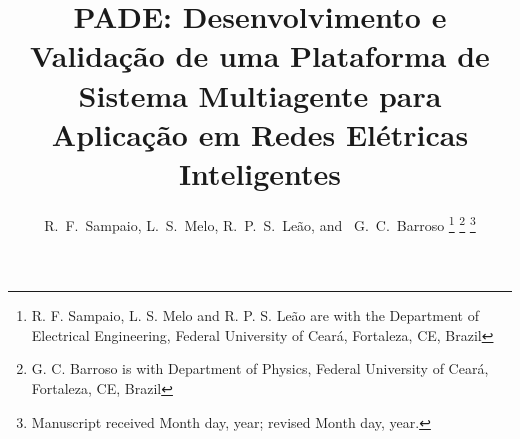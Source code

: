 \documentclass[journal]{IEEEtran}
\begin{document}
%
\title{PADE: Desenvolvimento e Validação de uma Plataforma de Sistema Multiagente para Aplicação em Redes Elétricas Inteligentes}
%
%
%

\author{R.~F.~Sampaio,
        L.~S.~Melo,
        R.~P.~S.~Leão,
        and ~G.~C.~Barroso%
\thanks{R. F. Sampaio, L. S. Melo and R. P. S. Leão are with the Department
of Electrical Engineering, Federal University of Ceará, Fortaleza,
CE, Brazil}%
\thanks{G. C. Barroso is with Department of Physics, Federal University of Ceará, Fortaleza, CE, Brazil}%
\thanks{Manuscript received Month day, year; revised Month day, year.}}

% 
%
\end{document}
